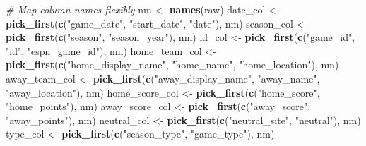 \documentclass[
]{article}
\newenvironment{Shaded}{\begin{snugshade}}{\end{snugshade}}
\newcommand{\CommentTok}[1]{\textcolor[rgb]{0.56,0.35,0.01}{\textit{#1}}}
\newcommand{\FunctionTok}[1]{\textcolor[rgb]{0.13,0.29,0.53}{\textbf{#1}}}
\newcommand{\NormalTok}[1]{#1}
\newcommand{\OtherTok}[1]{\textcolor[rgb]{0.56,0.35,0.01}{#1}}
\newcommand{\StringTok}[1]{\textcolor[rgb]{0.31,0.60,0.02}{#1}}
\begin{document}
\begin{Shaded}
\begin{Highlighting}[]
\CommentTok{\# Map column names flexibly}
\NormalTok{nm }\OtherTok{\textless{}{-}} \FunctionTok{names}\NormalTok{(raw)}
\NormalTok{date\_col }\OtherTok{\textless{}{-}} \FunctionTok{pick\_first}\NormalTok{(}\FunctionTok{c}\NormalTok{(}\StringTok{"game\_date"}\NormalTok{, }\StringTok{"start\_date"}\NormalTok{, }\StringTok{"date"}\NormalTok{), nm)}
\NormalTok{season\_col }\OtherTok{\textless{}{-}} \FunctionTok{pick\_first}\NormalTok{(}\FunctionTok{c}\NormalTok{(}\StringTok{"season"}\NormalTok{, }\StringTok{"season\_year"}\NormalTok{), nm)}
\NormalTok{id\_col }\OtherTok{\textless{}{-}} \FunctionTok{pick\_first}\NormalTok{(}\FunctionTok{c}\NormalTok{(}\StringTok{"game\_id"}\NormalTok{, }\StringTok{"id"}\NormalTok{, }\StringTok{"espn\_game\_id"}\NormalTok{), nm)}
\NormalTok{home\_team\_col }\OtherTok{\textless{}{-}} \FunctionTok{pick\_first}\NormalTok{(}\FunctionTok{c}\NormalTok{(}\StringTok{"home\_display\_name"}\NormalTok{, }\StringTok{"home\_name"}\NormalTok{, }\StringTok{"home\_location"}\NormalTok{), nm)}
\NormalTok{away\_team\_col }\OtherTok{\textless{}{-}} \FunctionTok{pick\_first}\NormalTok{(}\FunctionTok{c}\NormalTok{(}\StringTok{"away\_display\_name"}\NormalTok{, }\StringTok{"away\_name"}\NormalTok{, }\StringTok{"away\_location"}\NormalTok{), nm)}
\NormalTok{home\_score\_col }\OtherTok{\textless{}{-}} \FunctionTok{pick\_first}\NormalTok{(}\FunctionTok{c}\NormalTok{(}\StringTok{"home\_score"}\NormalTok{, }\StringTok{"home\_points"}\NormalTok{), nm)}
\NormalTok{away\_score\_col }\OtherTok{\textless{}{-}} \FunctionTok{pick\_first}\NormalTok{(}\FunctionTok{c}\NormalTok{(}\StringTok{"away\_score"}\NormalTok{, }\StringTok{"away\_points"}\NormalTok{), nm)}
\NormalTok{neutral\_col }\OtherTok{\textless{}{-}} \FunctionTok{pick\_first}\NormalTok{(}\FunctionTok{c}\NormalTok{(}\StringTok{"neutral\_site"}\NormalTok{, }\StringTok{"neutral"}\NormalTok{), nm)}
\NormalTok{type\_col }\OtherTok{\textless{}{-}} \FunctionTok{pick\_first}\NormalTok{(}\FunctionTok{c}\NormalTok{(}\StringTok{"season\_type"}\NormalTok{, }\StringTok{"game\_type"}\NormalTok{), nm)}


\end{Highlighting}
\end{Shaded}
\end{document}
